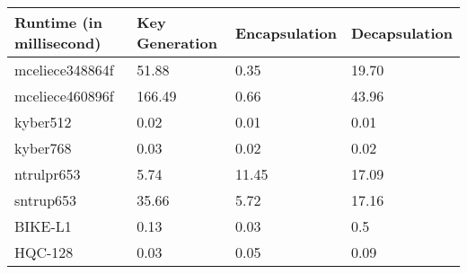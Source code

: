 \documentclass{article}
\begin{document}
\begin{table}[]
\begin{tabular}{|l|l|l|l|}
\hline
Runtime (in millisecond) & Key Generation & Encapsulation & Decapsulation \\ \hline
mceliece348864f          & 51.88          & 0.35          & 19.70         \\ \hline
mceliece460896f          & 166.49         & 0.66          & 43.96         \\ \hline
kyber512                 & 0.02           & 0.01          & 0.01          \\ \hline
kyber768                 & 0.03           & 0.02          & 0.02          \\ \hline
ntrulpr653               & 5.74           & 11.45         & 17.09         \\ \hline
sntrup653                & 35.66          & 5.72          & 17.16         \\ \hline
BIKE-L1                  & 0.13           & 0.03          & 0.5           \\ \hline
HQC-128                  & 0.03           & 0.05          & 0.09          \\ \hline
\end{tabular}
\end{table}
\end{document}
